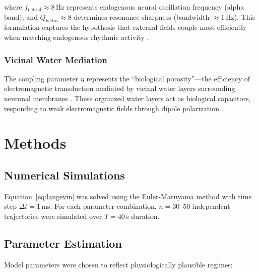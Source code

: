 \documentclass[10pt,a4paper]{article}
\begin{document}
where $f_{\text{neural}} \approx 8$\,Hz represents endogenous neural oscillation frequency 
(alpha band), and $Q_{\text{factor}} \approx 8$ determines resonance sharpness (bandwidth 
$\approx 1$\,Hz). This formulation captures the hypothesis that external fields couple 
most efficiently when matching endogenous rhythmic activity \citep{frhlich2016endogenous}.

\subsubsection{Vicinal Water Mediation}

The coupling parameter $\eta$ represents the ``biological porosity''---the efficiency 
of electromagnetic transduction mediated by vicinal water layers surrounding neuronal 
membranes \citep{pollack2001cells, chaplin2006water}. These organized water layers act 
as biological capacitors, responding to weak electromagnetic fields through dipole 
polarization \citep{firaux2024dynamic}.

\section{Methods}

\subsection{Numerical Simulations}

Equation~\ref{eq:langevin} was solved using the Euler-Maruyama method \citep{kloeden1992numerical} 
with time step $\Delta t = 1$\,ms. For each parameter combination, $n = 30$--50 independent 
trajectories were simulated over $T = 40$\,s duration.

\subsection{Parameter Estimation}

Model parameters were chosen to reflect physiologically plausible regimes:
\end{document}

